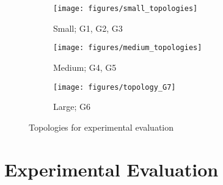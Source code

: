 \begin{figure*}[t]
	\centering
	\begin{subfigure}{0.185\linewidth}
      \centering
	   \texttt{[image: figures/small\_topologies]}
	   \caption{Small; G1, G2, G3}
      \label{fig:small_topologies}
	\end{subfigure}
	\centering
	\begin{subfigure}{0.45\linewidth}
      \centering
	   \texttt{[image: figures/medium\_topologies]}
	   \caption{Medium; G4, G5}
      \label{fig:medium_topologies}
	\end{subfigure}
	\begin{subfigure}{0.3\linewidth}
      \centering
	   \texttt{[image: figures/topology\_G7]}
	   \caption{Large; G6}
      \label{fig:large_topology}
	\end{subfigure}
   \caption{Topologies for experimental evaluation}
   \label{fig:topologies}
\vspace{-1ex}
\end{figure*}

\section{Experimental Evaluation}

